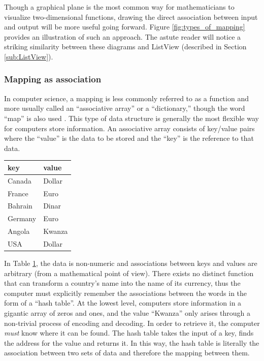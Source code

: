 Though a graphical plane is the most common way for mathematicians to visualize two-dimensional functions, drawing the direct association between input and output will be more useful going forward. Figure \ref{fig:types_of_mapping} provides an illustration of such an approach. The astute reader will notice a striking similarity between these diagrams and ListView (described in Section \ref{sub:ListView}).  


	\subsubsection{Mapping as association}

In computer science, a mapping is less commonly referred to as a function and more usually called an ``associative array'' or a ``dictionary,'' though the word ``map'' is also used \cite{data_structures}. This type of data structure is generally the most flexible way for computers store information. An associative array consists of key/value pairs where the ``value'' is the data to be stored and the ``key'' is the reference to that data. 

\begin{table}[!h]
	\centering
	\label{tab:key_value_pairs}
	\begin{tabular}{l l}
		\hline\hline
		key&value\\
		\hline
		Canada&Dollar\\
		France&Euro\\
		Bahrain&Dinar\\
		Germany&Euro\\
		Angola&Kwanza\\
		USA&Dollar\\
		\hline
	\end{tabular}
\end{table}

In Table \ref{tab:key_value_pairs}, the data is non-numeric and associations between keys and values are arbitrary (from a mathematical point of view). There exists no distinct function that can transform a country's name into the name of its currency, thus the computer must explicitly remember the associations between the words in the form of a ``hash table''. 
At the lowest level, computers store information in a gigantic array of zeros and ones, and the value ``Kwanza'' only arises through a non-trivial process of encoding and decoding. In order to retrieve it, the computer \emph{must} know where it can be found. The hash table takes the input of a key, finds the address for the value and returns it. In this way, the hash table is literally the association between two sets of data and therefore the mapping between them. 

